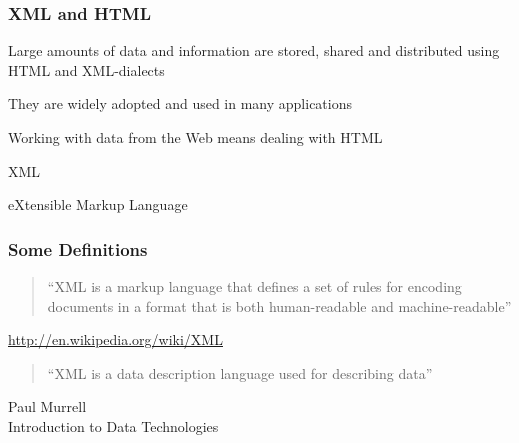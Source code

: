 \documentclass[12pt]{beamer}\usepackage[]{graphicx}\usepackage[]{color}
\begin{document}

\begin{frame}
\frametitle{XML and HTML}

\bbi
  \item Large amounts of data and information are stored, shared and distributed using HTML and XML-dialects
  \item They are widely adopted and used in many applications
  \item Working with data from the Web means dealing with HTML
\ei
\eb

\end{frame}


\begin{frame}
 \begin{center}
  {\Huge \hilit XML}
  
  \bigskip
  {\Large \hilit eXtensible Markup Language}
 \end{center}
\end{frame}


\begin{frame}
\frametitle{Some Definitions}

\begin{quotation}
``XML is a markup language that defines a set of rules for encoding documents in a format that is both human-readable and machine-readable''
\end{quotation}

{\footnotesize 
\hspace{8mm} \url{http://en.wikipedia.org/wiki/XML}
}

\bigskip
\begin{quotation}
``XML is a data description language used for describing data''
\end{quotation}

{\footnotesize 
\hspace{8mm} {\hilit Paul Murrell} \\
\hspace{8mm} {\lolit Introduction to Data Technologies}
}

\end{frame}

\end{document}
